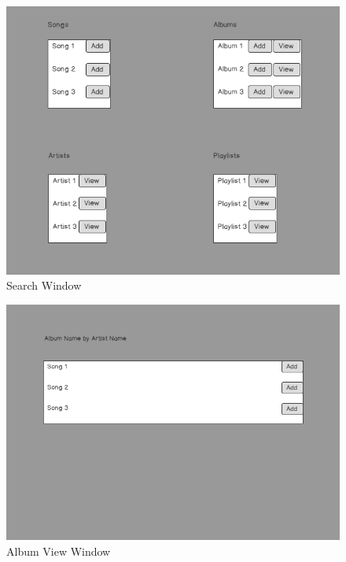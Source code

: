 \documentclass[12pt]{article}
\begin{document}
	\begin{figure}[H]
	\centering
	\includegraphics[scale=0.35]{SearchWindow.png}
	\caption{Search Window}
	\label{fig:search}
	\end{figure}
		\begin{figure}[H]
		\centering
		\includegraphics[scale=0.35]{AlbumWindow.png}
		\caption{Album View Window}
		\label{fig:album}
	\end{figure}
\end{document}

